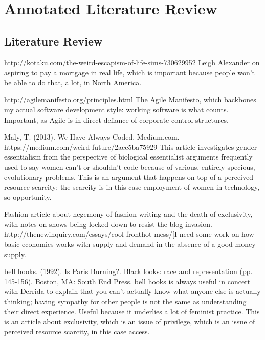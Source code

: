 
\chapter{Annotated Literature Review} %

\label{AppendixB} %



\section{Literature Review}

http://kotaku.com/the-weird-escapism-of-life-sims-730629952 Leigh Alexander on aspiring to pay a mortgage in real life, which is important because people won't be able to do that, a lot, in North America. 

http://agilemanifesto.org/principles.html The Agile Manifesto, which backbones my actual software development style: working software is what counts. Important, as Agile is in direct defiance of corporate control structures.

Maly, T. (2013). We Have Always Coded. Medium.com. https://medium.com/weird-future/2acc5ba75929
	This article investigates gender essentialism from the perspective of biological essentialist arguments frequently used to say women can't or shouldn't code because of various, entirely specious, evolutionary problems. This is an argument that happens on top of a perceived resource scarcity; the scarcity is in this case employment of women in technology, so opportunity.

Fashion article about hegemony of fashion writing and the death of exclusivity, with notes on shows being locked down to resist the blog invasion. http://thenewinquiry.com/essays/cool-fronthot-mess/[I need some work on how basic economics works with supply and demand in the absence of a good money supply.

bell hooks. (1992). Is Paris Burning?. Black looks: race and representation (pp. 145-156). Boston, MA: South End Press.
	bell hooks is always useful in concert with Derrida to explain that you can't actually know what anyone else is actually thinking; having sympathy for other people is not the same as understanding their direct experience. Useful because it underlies a lot of feminist practice. This is an article about exclusivity, which is an issue of privilege, which is an issue of perceived resource scarcity, in this case access.


